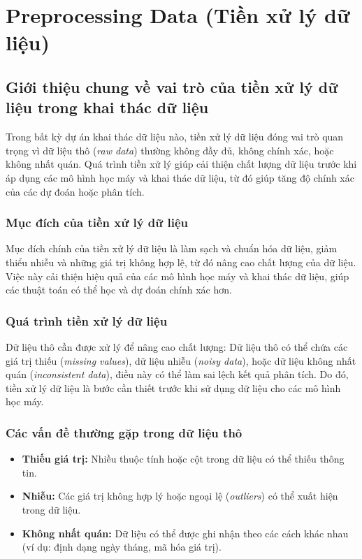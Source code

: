 \section{Preprocessing Data (Tiền xử lý dữ liệu)}

\subsection{Giới thiệu chung về vai trò của tiền xử lý dữ liệu trong khai thác dữ liệu}

\hspace{0.5cm}Trong bất kỳ dự án khai thác dữ liệu nào, tiền xử lý dữ liệu đóng vai trò quan trọng vì dữ liệu thô (\textit{raw data}) thường không đầy đủ, không chính xác, hoặc không nhất quán. Quá trình tiền xử lý giúp cải thiện chất lượng dữ liệu trước khi áp dụng các mô hình học máy và khai thác dữ liệu, từ đó giúp tăng độ chính xác của các dự đoán hoặc phân tích.

\subsubsection{Mục đích của tiền xử lý dữ liệu}

\hspace{0.5cm}Mục đích chính của tiền xử lý dữ liệu là làm sạch và chuẩn hóa dữ liệu, giảm thiểu nhiễu và những giá trị không hợp lệ, từ đó nâng cao chất lượng của dữ liệu. Việc này cải thiện hiệu quả của các mô hình học máy và khai thác dữ liệu, giúp các thuật toán có thể học và dự đoán chính xác hơn.

\subsubsection{Quá trình tiền xử lý dữ liệu}

\hspace{0.5cm}Dữ liệu thô cần được xử lý để nâng cao chất lượng: Dữ liệu thô có thể chứa các giá trị thiếu (\textit{missing values}), dữ liệu nhiễu (\textit{noisy data}), hoặc dữ liệu không nhất quán (\textit{inconsistent data}), điều này có thể làm sai lệch kết quả phân tích. Do đó, tiền xử lý dữ liệu là bước cần thiết trước khi sử dụng dữ liệu cho các mô hình học máy.

\subsubsection{Các vấn đề thường gặp trong dữ liệu thô}

\begin{itemize}
    \item \textbf{Thiếu giá trị:} Nhiều thuộc tính hoặc cột trong dữ liệu có thể thiếu thông tin.
	
    \item \textbf{Nhiễu:} Các giá trị không hợp lý hoặc ngoại lệ (\textit{outliers}) có thể xuất hiện trong dữ liệu.
	
    \item \textbf{Không nhất quán:} Dữ liệu có thể được ghi nhận theo các cách khác nhau (ví dụ: định dạng ngày tháng, mã hóa giá trị).
\end{itemize}

